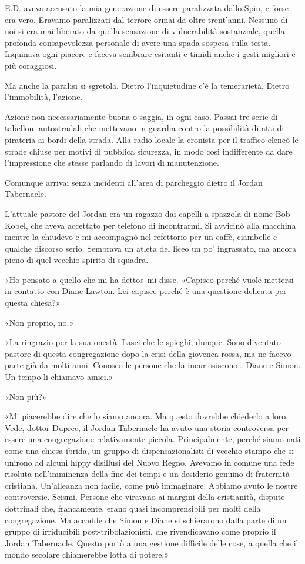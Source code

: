 E.D. aveva accusato la mia generazione di essere paralizzata dallo Spin,
e forse era vero. Eravamo paralizzati dal terrore ormai da oltre
trent'anni. Nessuno di noi si era mai liberato da quella sensazione di
vulnerabilità sostanziale, quella profonda consapevolezza personale di
avere una spada sospesa sulla testa. Inquinava ogni piacere e faceva
sembrare esitanti e timidi anche i gesti migliori e più coraggiosi.

Ma anche la paralisi si sgretola. Dietro l'inquietudine c'è la
temerarietà. Dietro l'immobilità, l'azione.

Azione non necessariamente buona o saggia, in ogni caso. Passai tre
serie di tabelloni autostradali che mettevano in guardia contro la
possibilità di atti di pirateria ai bordi della strada. Alla radio
locale la cronista per il traffico elencò le strade chiuse per motivi di
pubblica sicurezza, in modo così indifferente da dare l'impressione che
stesse parlando di lavori di manutenzione.

Comunque arrivai senza incidenti all'area di parcheggio dietro il Jordan
Tabernacle.

L'attuale pastore del Jordan era un ragazzo dai capelli a spazzola di
nome Bob Kobel, che aveva accettato per telefono di incontrarmi. Si
avvicinò alla macchina mentre la chiudevo e mi accompagnò nel refettorio
per un caffè, ciambelle e qualche discorso serio. Sembrava un atleta del
liceo un po' ingrassato, ma ancora pieno di quel vecchio spirito di
squadra.

«Ho pensato a quello che mi ha detto» mi disse. «Capisco perché vuole
mettersi in contatto con Diane Lawton. Lei capisce perché è una
questione delicata per questa chiesa?»

«Non proprio, no.»

«La ringrazio per la sua onestà. Lasci che le spieghi, dunque. Sono
diventato pastore di questa congregazione dopo la crisi della giovenca
rossa, ma ne facevo parte già da molti anni. Conosco le persone che la
incuriosiscono\ldots{} Diane e Simon. Un tempo li chiamavo amici.»

«Non più?»

«Mi piacerebbe dire che lo siamo ancora. Ma questo dovrebbe chiederlo a
loro. Vede, dottor Dupree, il Jordan Tabernacle ha avuto una storia
controversa per essere una congregazione relativamente piccola.
Principalmente, perché siamo nati come una chiesa ibrida, un gruppo di
dispensazionalisti di vecchio stampo che si unirono ad alcuni hippy
disillusi del Nuovo Regno. Avevamo in comune una fede risoluta
nell'imminenza della fine dei tempi e un desiderio genuino di fraternità
cristiana. Un'alleanza non facile, come può immaginare. Abbiamo avuto le
nostre controversie. Scismi. Persone che viravano ai margini della
cristianità, dispute dottrinali che, francamente, erano quasi
incomprensibili per molti della congregazione. Ma accadde che Simon e
Diane si schierarono dalla parte di un gruppo di irriducibili
post-tribolazionisti, che rivendicavano come proprio il Jordan
Tabernacle. Questo portò a una gestione difficile delle cose, a quella
che il mondo secolare chiamerebbe lotta di potere.»

